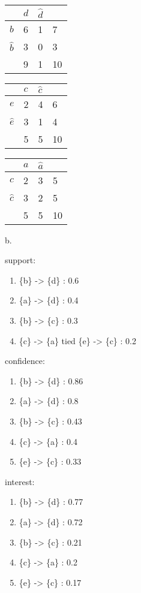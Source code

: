 \documentclass[11pt]{article}
\begin{document}
\begin{longtable}[]{@{}llll@{}}
\toprule
& \(d\) & \(\hat{d}\) &\tabularnewline
\midrule
\endhead
\(b\) & 6 & 1 & 7\tabularnewline
\(\hat{b}\) & 3 & 0 & 3\tabularnewline
& 9 & 1 & 10\tabularnewline
\bottomrule
\end{longtable}

\begin{longtable}[]{@{}llll@{}}
\toprule
& \(c\) & \(\hat{c}\) &\tabularnewline
\midrule
\endhead
\(e\) & 2 & 4 & 6\tabularnewline
\(\hat{e}\) & 3 & 1 & 4\tabularnewline
& 5 & 5 & 10\tabularnewline
\bottomrule
\end{longtable}

\begin{longtable}[]{@{}llll@{}}
\toprule
& \(a\) & \(\hat{a}\) &\tabularnewline
\midrule
\endhead
\(c\) & 2 & 3 & 5\tabularnewline
\(\hat{c}\) & 3 & 2 & 5\tabularnewline
& 5 & 5 & 10\tabularnewline
\bottomrule
\end{longtable}

b.

support:

\begin{enumerate}
\def\labelenumi{\arabic{enumi}.}
\item
  \{b\} -\textgreater{} \{d\} : 0.6
\item
  \{a\} -\textgreater{} \{d\} : 0.4
\item
  \{b\} -\textgreater{} \{c\} : 0.3
\item
  \{c\} -\textgreater{} \{a\} tied \{e\} -\textgreater{} \{c\} : 0.2
\end{enumerate}

confidence:

\begin{enumerate}
\def\labelenumi{\arabic{enumi}.}
\item
  \{b\} -\textgreater{} \{d\} : 0.86
\item
  \{a\} -\textgreater{} \{d\} : 0.8
\item
  \{b\} -\textgreater{} \{c\} : 0.43
\item
  \{c\} -\textgreater{} \{a\} : 0.4
\item
  \{e\} -\textgreater{} \{c\} : 0.33
\end{enumerate}

interest:

\begin{enumerate}
\def\labelenumi{\arabic{enumi}.}
\item
  \{b\} -\textgreater{} \{d\} : 0.77
\item
  \{a\} -\textgreater{} \{d\} : 0.72
\item
  \{b\} -\textgreater{} \{c\} : 0.21
\item
  \{c\} -\textgreater{} \{a\} : 0.2
\item
  \{e\} -\textgreater{} \{c\} : 0.17
\end{enumerate}
\end{document}
